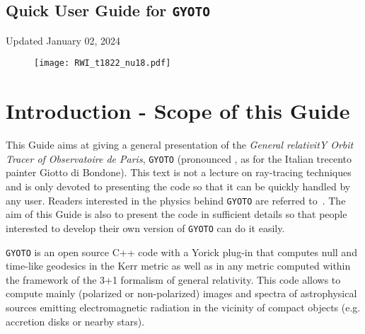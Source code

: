 \documentclass[a4paper,12pt]{article}
\begin{document}
\begin{center}
\section*{\Huge{Quick User Guide for \texttt{GYOTO}}}

\vspace{0.5cm}

\Large{Updated January 02, 2024}

\vspace{4cm}

\begin{figure}[htbp]
\centering
\texttt{[image: RWI\_t1822\_nu18.pdf]}
\end{figure}

\end{center}



\newpage

\section*{Introduction - Scope of this Guide}



This Guide aims at giving a general presentation of the \textit{General relativitY Orbit Tracer of Observatoire de Paris}, \texttt{GYOTO} (pronounced \textipa{[dZIoto]}, as for the Italian trecento painter Giotto di Bondone). This text is not a lecture on ray-tracing techniques and is only devoted to presenting the code so that it can be quickly handled by any user. Readers interested in the physics behind \texttt{GYOTO} are referred to~\citet[][and references therein]{vincent11a,vincent12a,aimar23}. The aim of this Guide is also to present the code in sufficient details so that people interested to develop their own version of \texttt{GYOTO} can do it easily.

\texttt{GYOTO} is an open source C++ code with a Yorick plug-in that computes null and time-like geodesics in the Kerr metric as well as in any metric computed within the framework of the 3+1 formalism of general relativity. This code allows to compute mainly (polarized or non-polarized) images and spectra of astrophysical sources emitting electromagnetic radiation in the vicinity of compact objects (e.g. accretion disks or nearby stars). 
\end{document}
